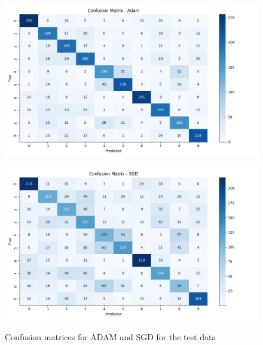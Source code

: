 \documentclass{tubaf-article}
\begin{document}
	\begin{figure}[h!]
		\centering
		\begin{minipage}{0.45\textwidth}
			\centering
			\includegraphics[width=\linewidth]{confusion_matrix_Adam.png}
			\label{fig:bild1}
		\end{minipage} \hfill
		\begin{minipage}{0.45\textwidth}
			\centering
			\includegraphics[width=\linewidth]{confusion_matrix_SGD.png}
			\label{fig:bild2}
		\end{minipage}
		\caption{Confusion matrices for ADAM and SGD for the test data}
		\label{fig:zwei_bilder}
	\end{figure}
\end{document}
